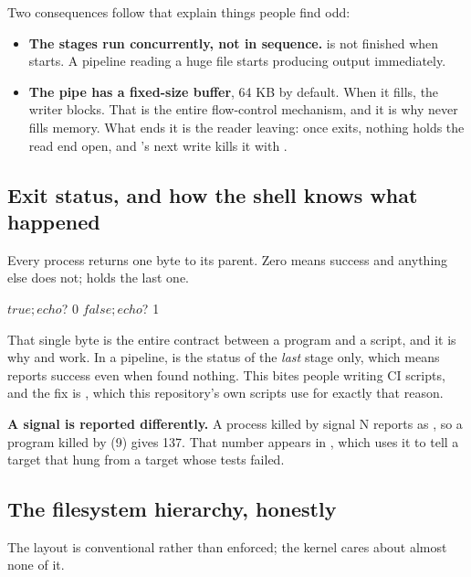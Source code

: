 Two consequences follow that explain things people find odd:
\begin{itemize}
  \item \textbf{The stages run concurrently, not in sequence.}  is not finished when
     starts. A pipeline reading a huge file starts producing output immediately.
  \item \textbf{The pipe has a fixed-size buffer}, 64 KB by default. When it fills, the writer
    blocks. That is the entire flow-control mechanism, and it is why  never fills
    memory. What ends it is the reader leaving: once  exits, nothing holds the read end
    open, and 's next write kills it with .
\end{itemize}

\subsection{Exit status, and how the shell knows what happened}
\label{c2:app:a3}

Every process returns one byte to its parent. Zero means success and anything else does not;
 holds the last one.

\begin{console}
$ true; echo $?
0
$ false; echo $?
1
\end{console}

\noindent That single byte is the entire contract between a program and a script, and it is why
 and  work. In a pipeline,  is the status
of the \emph{last} stage only, which means  reports success even when
 found nothing. This bites people writing CI scripts, and the fix is , which this repository's own scripts use for exactly that reason.

\textbf{A signal is reported differently.} A process killed by signal N reports as ,
so a program killed by  (9) gives 137. That number appears in , which
uses it to tell a target that hung from a target whose tests failed.

\subsection{The filesystem hierarchy, honestly}
\label{c2:app:a4}

The layout is conventional rather than enforced; the kernel cares about almost none of it.

